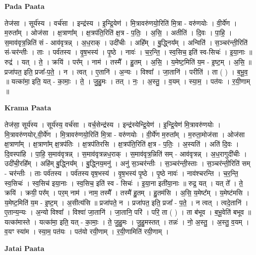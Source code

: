 \documentclass[17pt]{extarticle}
\begin{document}
\textbf{Pada Paata} \newline

तेज॑सा । सूर्य॑स्य । वर्च॑सा । इन्द्र॑स्य । इ॒न्द्रि॒येण॑ । मि॒त्रावरु॑णयो॒रिति॑ मि॒त्रा - वरु॑णयोः । वी॒र्ये॑ण । म॒रुता᳚म् । ओज॑सा । क्ष॒त्राणा᳚म् । क्ष॒त्रप॑ति॒रिति॑ क्ष॒त्र - प॒तिः॒ । अ॒सि॒ । अतीति॑ । दि॒वः । पा॒हि॒ । स॒माव॑वृत्र॒न्निति॑ सं - आव॑वृत्रन्न् । अ॒ध॒राक् । उदी॑चीः । अहि᳚म् । बु॒द्ध्निय᳚म् । अन्विति॑॑ । स॒ञ्चर॑न्ती॒रिति॑ सं-चर॑न्तीः । ताः । पर्व॑तस्य । वृ॒ष॒भस्य॑ । पृ॒ष्ठे । नावः॑ । च॒र॒न्ति॒ । स्व॒सिच॒ इति॑ स्व-सिचः॑ । इ॒या॒नाः ॥ रुद्र॑ । यत् । ते॒ । क्रयि॑ । पर᳚म् । नाम॑ । तस्मै᳚ । हु॒तम् । अ॒सि॒ । य॒मेष्ट॒मिति॑ य॒म - इ॒ष्ट॒म् । अ॒सि॒ ॥ प्रजा॑पत॒ इति॒ प्रजा᳚-प॒ते॒ । न । त्वत् । ए॒तानि॑ । अ॒न्यः । विश्वा᳚ । जा॒तानि॑ । परीति॑ । ता ( ) । ब॒भू॒व॒ ॥ यत्का॑मा॒ इति॒ यत् - का॒माः॒ । ते॒ । जु॒हु॒मः । तत् । नः॒ । अ॒स्तु॒ । व॒यम् । स्या॒म॒ । पत॑यः । र॒यी॒णाम् ॥  \newline


\textbf{Krama Paata} \newline

तेज॑सा॒ सूर्य॑स्य । सूर्य॑स्य॒ वर्च॑सा । वर्च॒सेन्द्र॑स्य । इन्द्र॑स्येन्द्रि॒येण॑ । इ॒न्द्रि॒येण॑ मि॒त्रावरु॑णयोः । मि॒त्रावरु॑णयोर्,वी॒र्ये॑ण । मि॒त्रावरु॑णयो॒रिति॑ मि॒त्रा - वरु॑णयोः । वी॒र्ये॑ण म॒रुता᳚म् । म॒रुता॒मोज॑सा । ओज॑सा क्ष॒त्राणा᳚म् । क्ष॒त्राणा᳚म् क्ष॒त्रप॑तिः । क्ष॒त्रप॑तिरसि । क्ष॒त्रप॑ति॒रिति॑ क्ष॒त्र - प॒तिः॒ । अ॒स्यति॑ । अति॑ दि॒वः । दि॒वस्पा॑हि । पा॒हि॒ स॒माव॑वृत्रन्न् । स॒माव॑वृत्रन्नध॒राक् । स॒माव॑वृत्र॒न्निति॑ सम् - आव॑वृत्रन्न् । अ॒ध॒रागुदी॑चीः । उदी॑ची॒रहि᳚म् । अहि॑म् बु॒द्ध्निय᳚म् । बु॒द्ध्निय॒मनु॑ । अनु॑ स॒ञ्चर॑न्तीः । स॒ञ्चर॑न्ती॒स्ताः । स॒ञ्चर॑न्ती॒रिति॑ सम् - चर॑न्तीः । ताः पर्व॑तस्य । पर्व॑तस्य वृष॒भस्य॑ । वृ॒ष॒भस्य॑ पृ॒ष्ठे । पृ॒ष्ठे नावः॑ । नाव॑श्चरन्ति । च॒र॒न्ति॒ स्व॒सिचः॑ । स्व॒सिच॑ इया॒नाः । स्व॒सिच॒ इति॑ स्व - सिचः॑ । इ॒या॒ना इती॑या॒नाः ॥ रुद्र॒ यत् । यत् ते᳚ । ते॒ क्रयि॑ । क्रयी॒ पर᳚म् । पर॒म् नाम॑ । नाम॒ तस्मै᳚ । तस्मै॑ हु॒तम् । हु॒तम॑सि । अ॒सि॒ य॒मेष्ट᳚म् । य॒मेष्ट॑मसि । य॒मेष्ट॒मिति॑ य॒म - इ॒ष्ट॒म् । अ॒सीत्य॑सि ॥ प्रजा॑पते॒ न । प्रजा॑पत॒ इति॒ प्रजा᳚ - प॒ते॒ । न त्वत् । त्वदे॒तानि॑ । ए॒तान्य॒न्यः । अ॒न्यो विश्वा᳚ । विश्वा॑ जा॒तानि॑ । जा॒तानि॒ परि॑ । परि॒ ता ( ) । ता ब॑भूव । ब॒भू॒वेति॑ बभूव ॥ यत्का॑मास्ते । यत्का॑मा॒ इति॒ यत् - का॒माः॒ । ते॒ जु॒हु॒मः । जु॒हु॒मस्तत् । तन्नः॑ । नो॒ अ॒स्तु॒ । अ॒स्तु॒ व॒यम् । व॒यꣳ स्या॑म । स्या॒म॒ पत॑यः । पत॑यो रयी॒णाम् । र॒यी॒णामिति॑ रयी॒णाम् । \newline

\textbf{Jatai Paata} \newline
\end{document}
